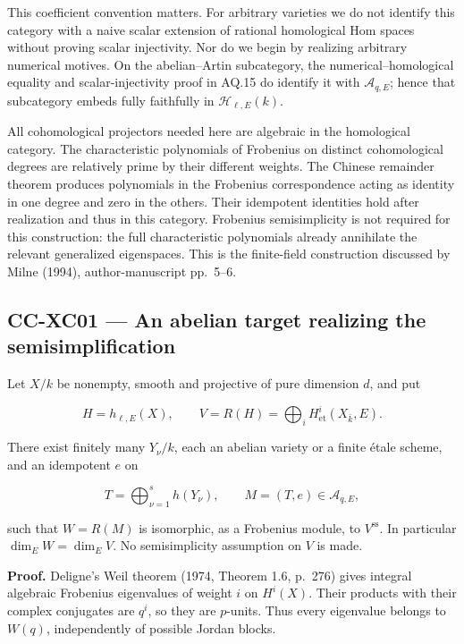 \documentclass[11pt,a4paper]{article}
\theoremstyle{definition}\newtheorem{definition}[theorem]{Definition}
\theoremstyle{remark}\newtheorem{remark}[theorem]{Remark}
\begin{document}
This coefficient convention matters. For arbitrary varieties we do not
identify this category with a naive scalar extension of rational
homological Hom spaces without proving scalar injectivity. Nor do we
begin by realizing arbitrary numerical motives. On the abelian--Artin
subcategory, the numerical--homological equality and scalar-injectivity
proof in AQ.15 do identify it with \(\mathcal A_{q,E}\); hence that
subcategory embeds fully faithfully in \(\mathcal H_{\ell,E}(k)\).

All cohomological projectors needed here are algebraic in the
homological category. The characteristic polynomials of Frobenius on
distinct cohomological degrees are relatively prime by their different
weights. The Chinese remainder theorem produces polynomials in the
Frobenius correspondence acting as identity in one degree and zero in
the others. Their idempotent identities hold after realization and thus
in this category. Frobenius semisimplicity is not required for this
construction: the full characteristic polynomials already annihilate the
relevant generalized eigenspaces. This is the finite-field construction
discussed by Milne (1994), author-manuscript pp.~5--6.

\subsection{CC-XC01 --- An abelian target realizing the
semisimplification}\label{cc-xc01-an-abelian-target-realizing-the-semisimplification}

Let \(X/k\) be nonempty, smooth and projective of pure dimension \(d\),
and put

\[
 H=h_{\ell,E}(X),\qquad V=R(H)=\bigoplus_i H^i_{\mathrm{et}}(X_{\bar k},E).
\]

There exist finitely many \(Y_\nu/k\), each an abelian variety or a
finite étale scheme, and an idempotent \(e\) on

\[
 T=\bigoplus_{\nu=1}^s h(Y_\nu),\qquad M=(T,e)\in\mathcal A_{q,E},
\]

such that \(W=R(M)\) is isomorphic, as a Frobenius module, to
\(V^{\mathrm{ss}}\). In particular \(\dim_E W=\dim_E V\). No
semisimplicity assumption on \(V\) is made.

\textbf{Proof.} Deligne's Weil theorem (1974, Theorem 1.6, p.~276) gives
integral algebraic Frobenius eigenvalues of weight \(i\) on \(H^i(X)\).
Their products with their complex conjugates are \(q^i\), so they are
\(p\)-units. Thus every eigenvalue belongs to \(W(q)\), independently of
possible Jordan blocks.
\end{document}
